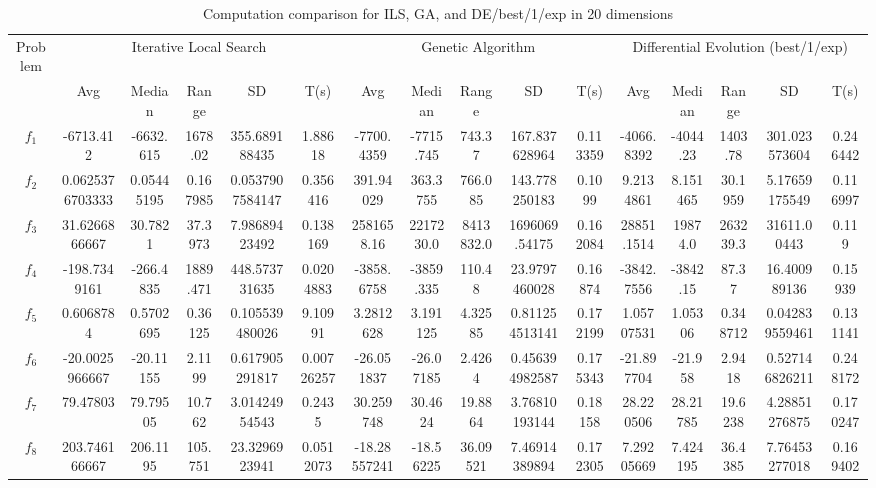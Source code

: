 \documentclass[paper=a4, fontsize=11pt]{scrartcl} %
\numberwithin{equation}{section} %
\numberwithin{figure}{section} %
\numberwithin{table}{section} %
\begin{document}
\begin{landscape}
	\begin{table}
		\tiny
		\centering
		\caption{Computation comparison for ILS, GA, and DE/best/1/exp in 20 dimensions}
		\label{Tab1d}
		\begin{tabular}{c|ccccc|ccccc|ccccc}
			\noalign{\smallskip}\hline\noalign{\smallskip}
			Problem & \multicolumn{5}{c}{Iterative Local Search}& \multicolumn{5}{|c|}{Genetic Algorithm}
			&  \multicolumn{5}{c}{Differential Evolution (best/1/exp)} \\ 
			\noalign{\smallskip}\hline\noalign{\smallskip}
			& Avg & Median & Range & SD & T(s) & Avg & Median
			& Range & SD & T(s) & Avg & Median & Range & SD &
			T(s) \\ 
			\noalign{\smallskip}\hline\noalign{\smallskip}
			$f_{1}$ & -6713.412 & -6632.615 & 1678.02 & 355.689188435 & 1.88618 & -7700.4359 & -7715.745 & 743.37 & 167.837628964 & 0.113359 & -4066.8392 & -4044.23 & 1403.78 & 301.023573604 & 0.246442\\
			$f_{2}$ & 0.0625376703333 & 0.05445195 & 0.167985 & 0.0537907584147 & 0.356416 & 391.94029 & 363.3755 & 766.085 & 143.778250183 & 0.1099 & 9.2134861 & 8.151465 & 30.1959 & 5.17659175549 & 0.116997\\
			$f_{3}$ & 31.6266866667 & 30.7821 & 37.3973 & 7.98689423492 & 0.138169 & 2581658.16 & 2217230.0 & 8413832.0 & 1696069.54175 & 0.162084 & 28851.1514 & 19874.0 & 263239.3 & 31611.00443 & 0.119\\
			$f_{4}$ & -198.7349161 & -266.4835 & 1889.471 & 448.573731635 & 0.0204883 & -3858.6758 & -3859.335 & 110.48 & 23.9797460028 & 0.16874 & -3842.7556 & -3842.15 & 87.37 & 16.400989136 & 0.15939\\
			$f_{5}$ & 0.6068784 & 0.5702695 & 0.36125 & 0.105539480026 & 9.10991 & 3.2812628 & 3.191125 & 4.32585 & 0.811254513141 & 0.172199 & 1.05707531 & 1.05306 & 0.348712 & 0.042839559461 & 0.131141\\
			$f_{6}$ & -20.0025966667 & -20.11155 & 2.1199 & 0.617905291817 & 0.00726257 & -26.051837 & -26.07185 & 2.4264 & 0.456394982587 & 0.175343 & -21.897704 & -21.958 & 2.9418 & 0.527146826211 & 0.248172\\
			$f_{7}$ & 79.47803 & 79.79505 & 10.762 & 3.01424954543 & 0.2435 & 30.259748 & 30.4624 & 19.8864 & 3.76810193144 & 0.18158 & 28.220506 & 28.21785 & 19.6238 & 4.28851276875 & 0.170247\\
			$f_{8}$ & 203.746166667 & 206.1195 & 105.751 & 23.3296923941 & 0.0512073 & -18.28557241 & -18.56225 & 36.09521 & 7.46914389894 & 0.172305 & 7.29205669 & 7.424195 & 36.4385 & 7.76453277018 & 0.169402\\

\end{tabular}
\end{table}
\end{landscape}
\end{document}
